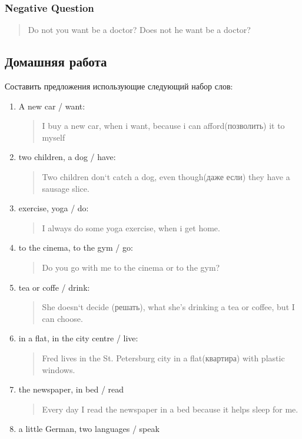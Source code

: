   \subsubsection{Negative Question} 
     \begin{quote}
  Do not you want be a doctor?
  Does not he want be a doctor?
  \end{quote}
 
 \subsection{Домашняя работа}
Составить предложения использующие следующий набор слов:
\begin{enumerate} 
	\item A new car / want:
	\begin{quote} 
	 	I buy a new car, when i want, because i can afford(позволить) it to myself 
	\end{quote} 
	\item two children, a dog / have:
	\begin{quote} 
		Two children don`t catch a dog, even though(даже если) they have a sausage slice.
	\end{quote}
	\item exercise, yoga / do:
	\begin{quote} 
		I always do some yoga exercise, when i get home.
	\end{quote}
	\item to the cinema, to the gym / go:
	\begin{quote} 
		Do you go with me to the cinema or to the gym?
	\end{quote}
	\item tea or coffe / drink:
	\begin{quote} 
		She doesn`t decide (решать), what she's drinking a tea or coffee, but I can choose.
	\end{quote}
	\item in a flat, in the city centre / live:
	\begin{quote} 
		Fred lives in the St. Petersburg city in a flat(квартира) with plastic windows.
	\end{quote}
	\item the newspaper, in bed / read
	\begin{quote} 
		Every day I read the newspaper in a bed because it helps sleep for me.
	\end{quote}
	\item a little German, two languages / speak
	\begin{quote} 	

\end{quote}
\end{enumerate}
